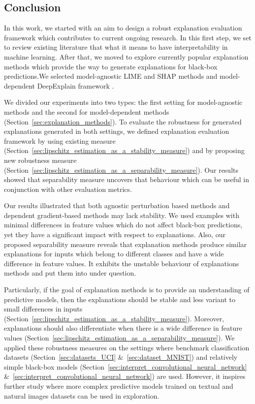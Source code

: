 \documentclass[english]{tktltiki2}
\theoremstyle{definition}
\theoremstyle{remark}
\begin{document}
\subsection{Conclusion} %
In this work, we started with an aim to design a robust explanation evaluation framework which contributes to current ongoing research. In this first step, we set to review existing literature that what it means to have interpretability in machine learning. After that, we moved to explore currently popular explanation methods which provide the way to generate explanations for black-box predictions.We selected model-agnostic LIME \citep{ribeiro2016model} and SHAP \citep{lundberg2017unified} methods and model-dependent DeepExplain framework \citep{ancona2017towards}. 

We divided our experiments into two types: the first setting for model-agnostic methods and the second for model-dependent methods (Section~\ref{sec:explanation_methods}). To evaluate the robustness for generated explanations generated in both settings, we defined explanation evaluation framework by using existing measure (Section~\ref{sec:lipschitz_estimation_as_a_stability_measure}) and by proposing new robustness measure (Section~\ref{sec:lipschitz_estimation_as_a_separability_measure}). Our results showed that separability measure uncovers that behaviour which can be useful in conjunction with other evaluation metrics. 

Our results illustrated that both agnostic perturbation based methods and dependent gradient-based methods may lack stability. We used examples with minimal differences in feature values which do not affect black-box predictions, yet they have a significant impact with respect to explanations. Also, our proposed separability measure reveals that explanation methods produce similar explanations for inputs which belong to different classes and have a wide difference in feature values. It exhibits the unstable behaviour of explanations methods and put them into under question.

Particularly, if the goal of explanation methods is to provide an understanding of predictive models, then the explanations should be stable and less variant to small differences in inputs (Section~\ref{sec:lipschitz_estimation_as_a_stability_measure}). Moreover, explanations should also differentiate when there is a wide difference in feature values (Section~\ref{sec:lipschitz_estimation_as_a_separability_measure}). We applied these robustness measures on the settings where benchmark classification datasets (Section~\ref{sec:datasets_UCI} \&~\ref{sec:dataset_MNIST}) and relatively simple black-box models (Section~\ref{sec:interpret_convolutional_neural_network} \&~\ref{sec:interpret_convolutional_neural_network}) are used. However, it inspires further study where more complex predictive models trained on textual and natural images datasets can be used in exploration. 
\end{document}
